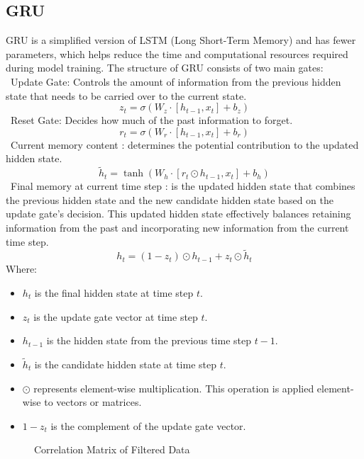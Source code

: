 \documentclass{ieeeojies}
\begin{document}
\subsection{GRU}
GRU is a simplified version of LSTM (Long Short-Term Memory) and has fewer parameters, which helps reduce the time and computational resources required during model training.
The structure of GRU consists of two main gates:
\\
\indent\textbullet\ Update Gate: Controls the amount of information from the previous hidden state that needs to be carried over to the current state.
\[
z_t = \sigma(W_z \cdot [h_{t-1}, x_t] + b_z)
\]
\indent\textbullet\  Reset Gate: Decides how much of the past information to forget. \\
\[
r_t = \sigma(W_r \cdot [h_{t-1}, x_t] + b_r)
\]
\indent\textbullet\ Current memory content : determines the potential contribution to the updated hidden state.\\
\[
\tilde{h}_t = \tanh(W_h \cdot [r_t \odot h_{t-1}, x_t] + b_h)
\]
\indent\textbullet\ Final memory at current time step : is the updated hidden state that combines the previous hidden state and the new candidate hidden state based on the update gate's decision. This updated hidden state effectively balances retaining information from the past and incorporating new information from the current time step.\\
\[
h_t = (1 - z_t) \odot h_{t-1} + z_t \odot \tilde{h}_t
\]
Where:
\begin{itemize}
  \item \( h_t \) is the final hidden state at time step \( t \).
  \item \( z_t \) is the update gate vector at time step \( t \).
  \item \( h_{t-1} \) is the hidden state from the previous time step \( t-1 \).
  \item \( \tilde{h}_t \) is the candidate hidden state at time step \( t \).
  \item \( \odot \) represents element-wise multiplication. This operation is applied element-wise to vectors or matrices.
  \item \( 1 - z_t \) is the complement of the update gate vector.
\end{itemize}


\begin{figure}[ht]
\centering
  \begin{minipage}{0.5\textwidth}
    \centering
    \caption{Correlation Matrix of Filtered Data}
    \label{tab:correlation_matrix}
  \end{minipage}
\end{figure}
\end{document}
